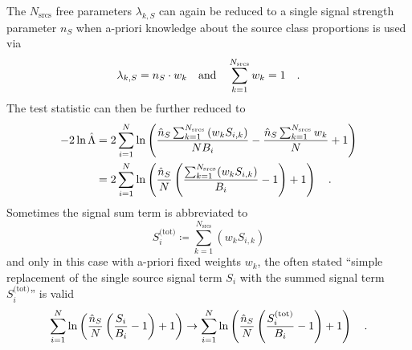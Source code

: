 The $N_\text{srcs}$ free parameters $\lambda_{k,S}$ can again be reduced to a single signal strength parameter $n_S$ when a-priori knowledge about the source class proportions is used via
\begin{equation}
  \lambda_{k,S} = n_S \cdot w_k
  \quad\text{and}\quad
  \sum_{k=1}^{N_\text{srcs}} w_k = 1
  \quad\text{.}
\end{equation}
The test statistic can then be further reduced to
\begin{align}
  -2\ln\hat{\Lambda}
  &= 2\sum_{i=1}^N \ln\left(
        \frac{\hat{n}_S \sum_{k=1}^{N_\text{srcs}}\left(w_k S_{i,k}\right)}
             {N B_i} -
        \frac{\hat{n}_S \sum_{k=1}^{N_\text{srcs}}w_k}{N} + 1
      \right) \\
  &= 2\sum_{i=1}^N \ln\left(
        \frac{\hat{n}_S}{N}\left(
          \frac{\sum_{k=1}^{N_\text{srcs}}(w_k S_{i,k})}{B_i} - 1
        \right) + 1
      \right)
  \quad\text{.}
\end{align}
Sometimes the signal sum term is abbreviated to
\begin{equation}
  S_i^\text{(tot)} \coloneqq \sum_{k=1}^{N_\text{srcs}}\left(w_k S_{i,k}\right)
\end{equation}
and only in this case with a-priori fixed weights $w_k$, the often stated \enquote{simple replacement of the single source signal term $S_i$ with the summed signal term $S_i^\text{(tot)}$} is valid
\begin{equation}
  \sum_{i=1}^N \ln\left(
      \frac{\hat{n}_S}{N}\left( \frac{S_i}{B_i} - 1 \right) + 1
    \right)
  \rightarrow
  \sum_{i=1}^N \ln\left(
      \frac{\hat{n}_S}{N}\left( \frac{S_i^\text{(tot)}}{B_i} - 1 \right) + 1
    \right)
  \quad\text{.}
\end{equation}

